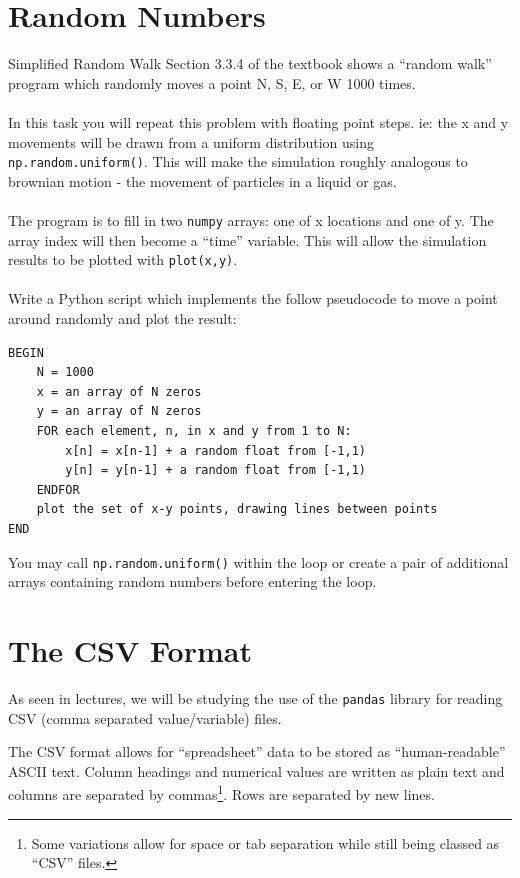 \documentclass{lab}
\begin{document}
\section{Random Numbers}
\begin{task}{Simplified Random Walk}{}
Section 3.3.4 of the textbook shows a ``random walk'' program which randomly moves a point N, S, E, or W 1000 times.
\\~\\
In this task you will repeat this problem with floating point steps. ie: the x and y movements will be drawn from a uniform distribution using \texttt{np.random.uniform()}. This will make the simulation roughly analogous to brownian motion - the movement of particles in a liquid or gas.
\\~\\
The program is to fill in two \texttt{numpy} arrays: one of x locations and one of y. The array index will then become a ``time'' variable. This will allow the simulation results to be plotted with \texttt{plot(x,y)}.
\\~\\
Write a Python script which implements the follow pseudocode to move a point around randomly and plot the result:
\begin{lstlisting}
BEGIN
	N = 1000
	x = an array of N zeros
	y = an array of N zeros
	FOR each element, n, in x and y from 1 to N:
		x[n] = x[n-1] + a random float from [-1,1)
		y[n] = y[n-1] + a random float from [-1,1)
	ENDFOR
	plot the set of x-y points, drawing lines between points
END
\end{lstlisting}
You may call \texttt{np.random.uniform()} within the loop or create a pair of additional arrays containing random numbers before entering the loop.
\end{task}

\pagebreak
\section{The CSV Format}

As seen in lectures, we will be studying the use of the \texttt{pandas} library for reading CSV (comma separated value/variable) files.

The CSV format allows for ``spreadsheet'' data to be stored as ``human-readable'' ASCII text. Column headings and numerical values are written as plain text and columns are separated by commas\footnote{Some variations allow for space or tab separation while still being classed as ``CSV'' files.}. Rows are separated by new lines.
\end{document}
